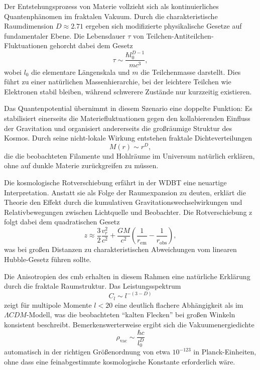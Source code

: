 Der Entstehungsprozess von Materie vollzieht sich als kontinuierliches Quantenphänomen im fraktalen Vakuum. Durch die charakteristische Raumdimension $D \approx 2.71$ ergeben sich modifizierte
physikalische Gesetze auf fundamentaler Ebene. Die Lebensdauer $\tau$ von Teilchen-Antiteilchen-Fluktuationen gehorcht dabei dem Gesetz
\begin{equation}
    \tau \sim \frac{\hbar l_0^{D-1}}{mc^3},
\end{equation}
wobei $l_0$ die elementare Längenskala und $m$ die Teilchenmasse darstellt. Dies führt zu einer natürlichen Massenhierarchie, bei der leichtere Teilchen wie Elektronen stabil bleiben, während schwerere
Zustände nur kurzzeitig existieren.

Das Quantenpotential übernimmt in diesem Szenario eine doppelte Funktion: Es stabilisiert einerseits die Materiefluktuationen gegen den kollabierenden Einfluss der Gravitation und organisiert
andererseits die großräumige Struktur des Kosmos. Durch seine nicht-lokale Wirkung entstehen fraktale Dichteverteilungen
\begin{equation}
    M(r) \sim r^D,
\end{equation}
die die beobachteten Filamente und Hohlräume im Universum natürlich erklären, ohne auf dunkle Materie zurückgreifen zu müssen.

Die kosmologische Rotverschiebung erfährt in der WDBT eine neuartige Interpretation. Anstatt sie als Folge der Raumexpansion zu deuten, erklärt die Theorie den Effekt durch die kumulativen
Gravitationswechselwirkungen und Relativbewegungen zwischen Lichtquelle und Beobachter. Die Rotverschiebung z folgt dabei dem quadratischen Gesetz
\begin{equation}
    z \approx \frac{3}{2}\frac{v_r^2}{c^2} + \frac{GM}{c^2}\left(\frac{1}{r_{\text{em}}} - \frac{1}{r_{\text{obs}}}\right),
\end{equation}
was bei großen Distanzen zu charakteristischen Abweichungen vom linearen Hubble-Gesetz führen sollte.

Die Anisotropien des \gls{cmb} erhalten in diesem Rahmen eine natürliche Erklärung durch die fraktale Raumstruktur. Das Leistungsspektrum
\begin{equation}
    C_l \sim l^{-(3-D)}
\end{equation}
zeigt für multipole Momente $l < 20$ eine deutlich flachere Abhängigkeit als im $\varLambda CDM$-Modell, was die beobachteten \enquote{kalten Flecken} bei großen Winkeln konsistent beschreibt.
Bemerkenswerterweise ergibt sich die Vakuumenergiedichte
\begin{equation}
    \rho_{\text{vac}} \sim \frac{\hbar c}{l_0^D}
\end{equation}
automatisch in der richtigen Größenordnung von etwa $10^{-123}$ in Planck-Einheiten, ohne dass eine feinabgestimmte kosmologische Konstante erforderlich wäre.

